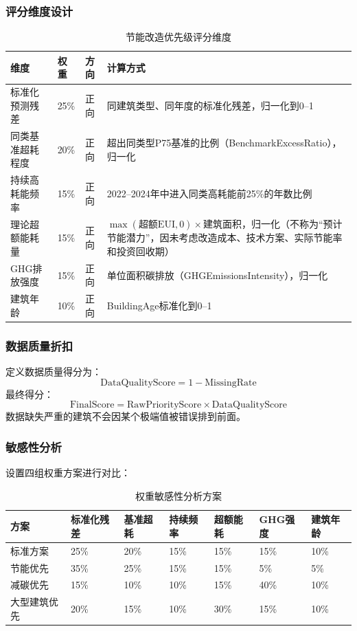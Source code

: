\subsubsection{评分维度设计}

\begin{table}[H]
\centering
\caption{节能改造优先级评分维度}
\label{tab:scoring}
\begin{tabular}{p{2.5cm}p{1.2cm}p{2cm}p{6cm}}
\hline
\textbf{维度} & \textbf{权重} & \textbf{方向} & \textbf{计算方式} \\
\hline
标准化预测残差 & 25\% & 正向 & 同建筑类型、同年度的标准化残差，归一化到0--1 \\
\hline
同类基准超耗程度 & 20\% & 正向 & 超出同类型P75基准的比例（BenchmarkExcessRatio），归一化 \\
\hline
持续高耗能频率 & 15\% & 正向 & 2022--2024年中进入同类高耗能前25\%的年数比例 \\
\hline
理论超额能耗量 & 15\% & 正向 & $\max(\text{超额EUI}, 0) \times \text{建筑面积}$，归一化（不称为``预计节能潜力''，因未考虑改造成本、技术方案、实际节能率和投资回收期） \\
\hline
GHG排放强度 & 15\% & 正向 & 单位面积碳排放（GHGEmissionsIntensity），归一化 \\
\hline
建筑年龄 & 10\% & 正向 & BuildingAge标准化到0--1 \\
\hline
\end{tabular}
\end{table}

\subsubsection{数据质量折扣}

定义数据质量得分为：
\[\text{DataQualityScore} = 1 - \text{MissingRate}\]
最终得分：
\[\text{FinalScore} = \text{RawPriorityScore} \times \text{DataQualityScore}\]
数据缺失严重的建筑不会因某个极端值被错误排到前面。

\subsubsection{敏感性分析}

设置四组权重方案进行对比：

\begin{table}[H]
\centering
\caption{权重敏感性分析方案}
\label{tab:sensitivity}
\begin{tabular}{p{2.5cm}p{1.8cm}p{1.8cm}p{1.8cm}p{1.8cm}p{1.8cm}p{1.8cm}}
\hline
\textbf{方案} & 标准化残差 & 基准超耗 & 持续频率 & 超额能耗 & GHG强度 & 建筑年龄 \\
\hline
标准方案 & 25\% & 20\% & 15\% & 15\% & 15\% & 10\% \\
节能优先 & 35\% & 25\% & 15\% & 15\% & 5\% & 5\% \\
减碳优先 & 15\% & 10\% & 10\% & 15\% & 40\% & 10\% \\
大型建筑优先 & 20\% & 15\% & 10\% & 30\% & 15\% & 10\% \\
\hline
\end{tabular}
\end{table}

